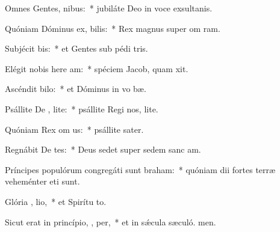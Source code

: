 \item Omnes Gentes,  nibus:~* jubiláte Deo in voce exsultanis.
\item Quóniam Dóminus ex, bilis:~* Rex magnus super om ram.
\item Subjécit  bis:~* et Gentes sub pédi tris.
\item Elégit nobis here am:~* spéciem Jacob, quam xit.
\item Ascéndit   bilo:~* et Dóminus in vo bæ.
\item Psállite De , lite:~* psállite Regi nos, lite.
\item Quóniam Rex om  us:~* psállite sater.
\item Regnábit De  tes:~* Deus sedet super sedem sanc am.
\item Príncipes populórum congregáti sunt   braham:~* quóniam dii fortes terræ veheménter eti sunt.
\item Glória ,  lio,~* et Spirítu to.
\item Sicut erat in princípio,  ,  per,~* et in sǽcula sæculó. men.

